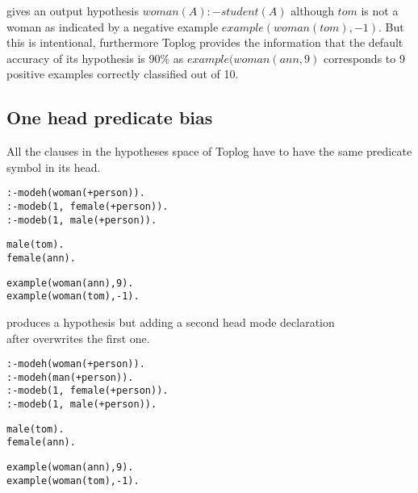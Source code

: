 gives an output hypothesis $woman(A) :- student(A)$ although $tom$ is not a woman as indicated by a negative example $example(woman(tom),-1)$.
But this is intentional, furthermore Toplog provides the information that the default accuracy of its hypothesis is 90\% as $example(woman(ann,9)$ corresponds to 9 positive examples correctly classified out of 10.

\subsection{One head predicate bias}\label{toplog_one_head_predicate_bias}
All the clauses in the hypotheses space of Toplog have to have the same predicate symbol in its head.

\begin{minipage}[t]{.40\textwidth}
\begin{lstlisting}
:-modeh(woman(+person)).
:-modeb(1, female(+person)).
:-modeb(1, male(+person)).
\end{lstlisting}
\end{minipage}
\begin{minipage}[t]{.20\textwidth}
\begin{lstlisting}
male(tom).
female(ann).
\end{lstlisting}
\end{minipage}
\begin{minipage}[t]{.20\textwidth}
\begin{lstlisting}
example(woman(ann),9).
example(woman(tom),-1).
\end{lstlisting}
\end{minipage}

produces a hypothesis  but adding a second
head mode declaration \\
 after  overwrites the first one.

\begin{minipage}[t]{.40\textwidth}
\begin{lstlisting}
:-modeh(woman(+person)).
:-modeh(man(+person)).
:-modeb(1, female(+person)).
:-modeb(1, male(+person)).
\end{lstlisting}
\end{minipage}
\begin{minipage}[t]{.20\textwidth}
\begin{lstlisting}
male(tom).
female(ann).
\end{lstlisting}
\end{minipage}
\begin{minipage}[t]{.20\textwidth}
\begin{lstlisting}
example(woman(ann),9).
example(woman(tom),-1).
\end{lstlisting}
\end{minipage}

